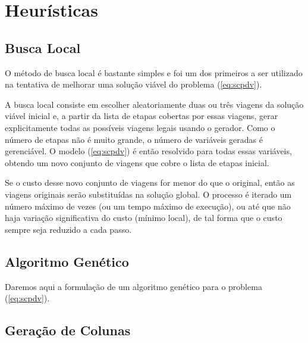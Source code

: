 \zerar
\chapter{Heurísticas}
\label{cap:heuristicas}



\section{Busca Local}
\label{sec:metodos_busca}

O método de busca local é bastante simples e foi um dos primeiros a ser utilizado na tentativa de 
melhorar uma solução viável do problema (\ref{eq:scpdv}). 

A busca local consiste em escolher aleatoriamente duas ou três viagens da solução viável inicial e, 
a partir da lista de etapas cobertas por essas viagens, gerar explicitamente todas as possíveis 
viagens legais usando o gerador. Como o número de etapas não é muito grande, o número de variáveis 
geradas é gerenciável. O modelo (\ref{eq:scpdv}) é então resolvido para todas essas variáveis, 
obtendo um novo conjunto de viagens que cobre o lista de etapas inicial. 

Se o custo desse novo conjunto de viagens for menor do que o original, então as viagens originais
serão substituídas na solução global. O processo é iterado um número máximo de vezes (ou um tempo 
máximo de execução), ou até que não haja variação significativa do custo (mínimo local), de tal 
forma que o custo sempre seja reduzido a cada passo.


\section{Algoritmo Genético}
\label{sec:metodos_genetico}

Daremos aqui a formulação de um algoritmo genético para o problema (\ref{eq:scpdv}). 


\section{Geração de Colunas}
\label{sec:metodos_colunas}

